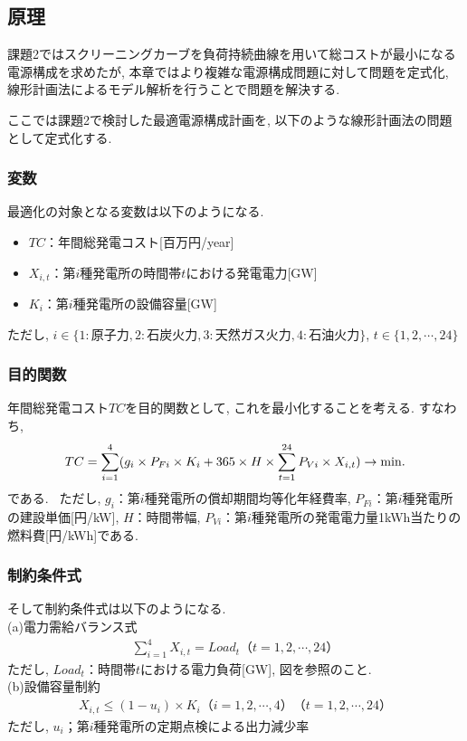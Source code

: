 \documentclass[]{jsarticle}
\begin{document}
  \subsection{原理\label{pri3}}
      課題2ではスクリーニングカーブを負荷持続曲線を用いて総コストが最小になる電源構成を求めたが, 本章ではより複雑な電源構成問題に対して問題を定式化, 線形計画法によるモデル解析を行うことで問題を解決する.

      ここでは課題2で検討した最適電源構成計画を, 以下のような線形計画法の問題として定式化する.

      \subsubsection{変数}
          最適化の対象となる変数は以下のようになる.
          \begin{itemize}
            \item $TC$：年間総発電コスト[百万円/year]
            \item $X_{i,t}$：第$i$種発電所の時間帯$t$における発電電力[GW]
            \item $K_i$：第$i$種発電所の設備容量[GW]
          \end{itemize}
          ただし, $i \in \{1:原子力, 2:石炭火力, 3:天然ガス火力, 4:石油火力\}$, $t \in \{1, 2, \cdots , 24\}$

      \subsubsection{目的関数}
          年間総発電コスト$TC$を目的関数として, これを最小化することを考える. すなわち,
          \begin{eqnarray}
              TC = \sum_{i=1}^4 (g_i \times P_{Fi} \times K_i + 365 \times H \times \sum_{t=1}^{24} P_{Vi} \times X_{i, t}) \to \rm{min}.
          \end{eqnarray}
          である. \
          ただし, $g_i$：第$i$種発電所の償却期間均等化年経費率, $P_{Fi}$：第$i$種発電所の建設単価[円/kW], $H$：時間帯幅, $P_{Vi}$：第$i$種発電所の発電電力量1kWh当たりの燃料費[円/kWh]である.

      \subsubsection{制約条件式}
          そして制約条件式は以下のようになる. \\
          (a)電力需給バランス式\\
            \begin{eqnarray}
              \sum_{i=1}^4 X_{i,t} = Load_t　（t = 1, 2, \cdots , 24）
            \end{eqnarray}
            ただし, $Load_t$：時間帯$t$における電力負荷[GW], 図を参照のこと.\\
          (b)設備容量制約\\
            \begin{eqnarray}
              X_{i,t} \le (1 - u_i)\times K_i　（i = 1, 2, \cdots , 4）（t = 1, 2, \cdots , 24）
            \end{eqnarray}
            ただし, $u_i$；第$i$種発電所の定期点検による出力減少率\\
\end{document}
